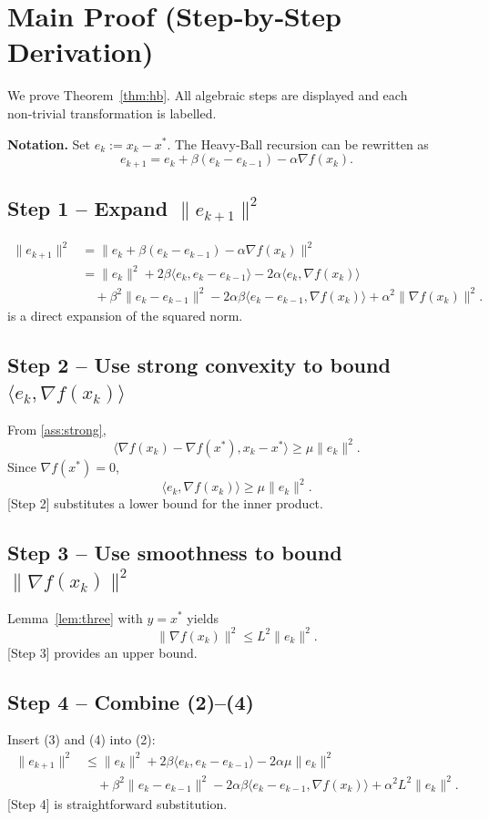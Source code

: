 \documentclass[11pt]{article}
\begin{document}
\section*{Main Proof (Step‑by‑Step Derivation)}
We prove Theorem~\ref{thm:hb}.  All algebraic steps are displayed and each non‑trivial transformation is labelled.

\noindent\textbf{Notation.}  Set $e_{k}:=x_{k}-x^{*}$.  The Heavy‑Ball recursion can be rewritten as
\begin{equation}
e_{k+1}=e_{k}+\beta(e_{k}-e_{k-1})-\alpha \nabla f(x_{k}).
\tag{1}
\end{equation}

\subsection*{Step 1 – Expand $\|e_{k+1}\|^{2}$}
\begin{align}
\|e_{k+1}\|^{2}
&= \|e_{k}+\beta(e_{k}-e_{k-1})-\alpha \nabla f(x_{k})\|^{2} \nonumber\\
&= \|e_{k}\|^{2}+2\beta\langle e_{k},e_{k}-e_{k-1}\rangle
      -2\alpha\langle e_{k},\nabla f(x_{k})\rangle \nonumber\\
&\quad +\beta^{2}\|e_{k}-e_{k-1}\|^{2}
      -2\alpha\beta\langle e_{k}-e_{k-1},\nabla f(x_{k})\rangle
      +\alpha^{2}\|\nabla f(x_{k})\|^{2}. \tag{2}
\end{align}
\noindent[Step 1] is a direct expansion of the squared norm.

\subsection*{Step 2 – Use strong convexity to bound $\langle e_{k},\nabla f(x_{k})\rangle$}
From \ref{ass:strong},
\[
\langle \nabla f(x_{k})-\nabla f(x^{*}),x_{k}-x^{*}\rangle\ge\mu\|e_{k}\|^{2}.
\]
Since $\nabla f(x^{*})=0$,
\[
\langle e_{k},\nabla f(x_{k})\rangle\ge\mu\|e_{k}\|^{2}. \tag{3}
\]
[Step 2] substitutes a lower bound for the inner product.

\subsection*{Step 3 – Use smoothness to bound $\|\nabla f(x_{k})\|^{2}$}
Lemma~\ref{lem:three} with $y=x^{*}$ yields
\[
\|\nabla f(x_{k})\|^{2}\le L^{2}\|e_{k}\|^{2}. \tag{4}
\]
[Step 3] provides an upper bound.

\subsection*{Step 4 – Combine (2)–(4)}
Insert (3) and (4) into (2):
\begin{align}
\|e_{k+1}\|^{2}
&\le \|e_{k}\|^{2}+2\beta\langle e_{k},e_{k}-e_{k-1}\rangle
      -2\alpha\mu\|e_{k}\|^{2} \nonumber\\
&\quad +\beta^{2}\|e_{k}-e_{k-1}\|^{2}
      -2\alpha\beta\langle e_{k}-e_{k-1},\nabla f(x_{k})\rangle
      +\alpha^{2}L^{2}\|e_{k}\|^{2}. \tag{5}
\end{align}
[Step 4] is straightforward substitution.
\end{document}
